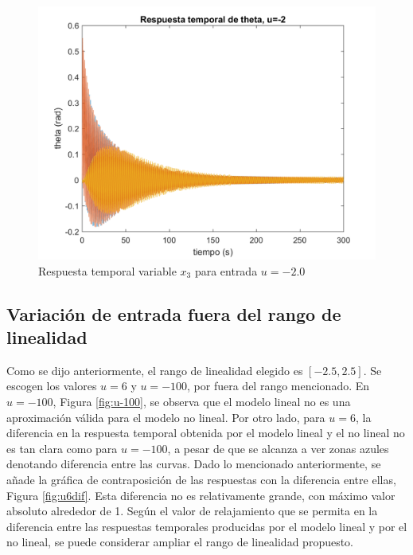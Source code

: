 \documentclass[journal]{IEEEtran}
\begin{document}
\begin{figure}[h!]
\caption{Respuesta temporal variable $x_3$ para entrada $u=-2.0$\label{fig:u-2}}
  \centering
\includegraphics[scale=0.19]{Graficaslvsnl/u-2.png}
\end{figure}
       
\subsection{Variación de entrada fuera del rango de linealidad}
Como se dijo anteriormente, el rango de linealidad elegido es $[-2.5,2.5]$. Se escogen los valores $u=6$ y $u=-100$, por fuera del rango mencionado. En $u=-100$, Figura \ref{fig:u-100}, se observa que el modelo lineal no es una aproximación válida para el modelo no lineal. Por otro lado, para $u=6$, la diferencia en la respuesta temporal obtenida por el modelo lineal y el no lineal no es tan clara como para $u=-100$, a pesar de que se alcanza a ver zonas azules denotando diferencia entre las curvas. Dado lo mencionado anteriormente, se añade la gráfica de contraposición de las respuestas con la diferencia entre ellas, Figura \ref{fig:u6dif}. Esta diferencia no es relativamente grande, con máximo valor absoluto alrededor de 1. Según el valor de relajamiento que se permita en la diferencia entre las respuestas temporales producidas por el modelo lineal y por el no lineal, se puede considerar ampliar el rango de linealidad propuesto.
\end{document}
